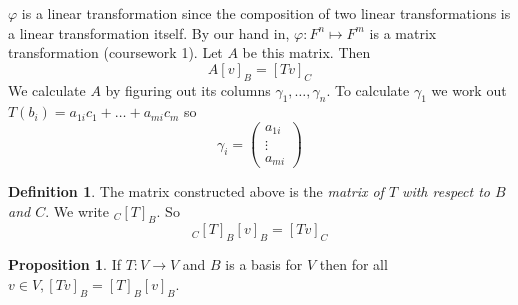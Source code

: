 \documentclass{report}
\theoremstyle{remark}
\theoremstyle{definition}
\newtheorem{definition}[theorem]{Definition}
\theoremstyle{definition}
\theoremstyle{theorem}
\newtheorem{proposition}[theorem]{Proposition}
\begin{document}
$\varphi$ is a linear transformation since the composition of two linear transformations is a linear transformation itself. By our hand in, $\varphi:F^n\mapsto F^m$ is a matrix transformation (coursework 1). Let $A$ be this matrix. Then $$A[v]_B = [Tv]_C$$ We calculate $A$ by figuring out its columns $\gamma_1,\ldots,\gamma_n$. To calculate $\gamma_1$ we work out $T(b_i) = a_{1i}c_1+\ldots + a_{mi}c_m$ so $$\gamma_i = \begin{pmatrix}a_{1i}\\ \vdots \\ a_{mi}\end{pmatrix}$$
\begin{definition}
The matrix constructed above is the \emph{matrix of $T$ with respect to $B$ and $C$}. We write $_C[T]_B$. So
\[_C[T]_B[v]_B=[Tv]_C\]
\end{definition}
\begin{proposition}
If $T:V\rightarrow V$ and $B$ is a basis for $V$ then for all $v \in V, [Tv]_B = [T]_B[v]_B$.
\end{proposition}
\end{document}
